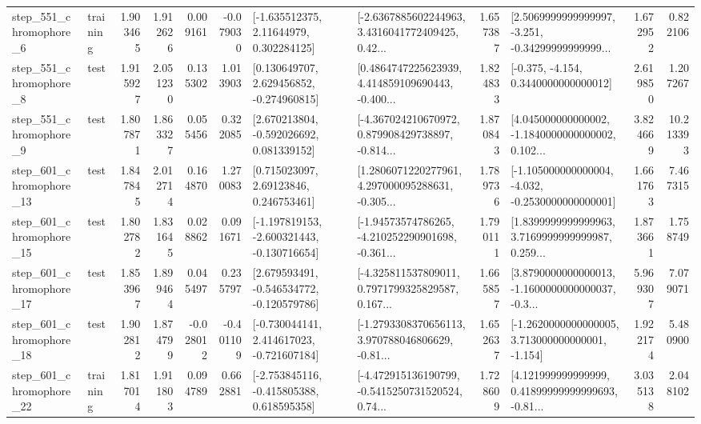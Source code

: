 \begin{tabular}{llrrrrllrlrr}
   step\_551\_chromophore\_6 &  training &      1.903465 &    1.912626 &      0.009161 & -0.079030 &     [-1.635512375, 2.11644979, 0.302284125] &  [-2.6367885602244963, 3.4316041772409425, 0.42... &       1.657387 &  [2.5069999999999997, -3.251, -0.34299999999999... &            1.672952 &          0.822106 \\
   step\_551\_chromophore\_8 &      test &      1.915927 &    2.051230 &      0.135302 &  1.013903 &    [0.130649707, 2.629456852, -0.274960815] &  [0.4864747225623939, 4.414859109690443, -0.400... &       1.824833 &               [-0.375, -4.154, 0.3440000000000012] &            2.619850 &          1.207267 \\
   step\_551\_chromophore\_9 &      test &      1.807871 &    1.863327 &      0.055456 &  0.322085 &    [2.670213804, -0.592026692, 0.081339152] &  [-4.367024210670972, 0.879908429738897, -0.814... &       1.870843 &  [4.045000000000002, -1.1840000000000002, 0.102... &            3.824669 &         10.213393 \\
  step\_601\_chromophore\_13 &      test &      1.847845 &    2.012714 &      0.164870 &  1.270083 &      [0.715023097, 2.69123846, 0.246753461] &  [1.2806071220277961, 4.297000095288631, -0.305... &       1.789736 &  [-1.105000000000004, -4.032, -0.2530000000000001] &            1.661763 &          7.467315 \\
  step\_601\_chromophore\_15 &      test &      1.802782 &    1.831645 &      0.028862 &  0.091671 &  [-1.197819153, -2.600321443, -0.130716654] &  [-1.94573574786265, -4.210252290901698, -0.361... &       1.790111 &  [1.8399999999999963, 3.7169999999999987, 0.259... &            1.873661 &          1.758749 \\
  step\_601\_chromophore\_17 &      test &      1.853967 &    1.899464 &      0.045497 &  0.235797 &   [2.679593491, -0.546534772, -0.120579786] &  [-4.325811537809011, 0.7971799325829587, 0.167... &       1.665857 &  [3.8790000000000013, -1.1600000000000037, -0.3... &            5.969307 &          7.079071 \\
  step\_601\_chromophore\_18 &      test &      1.902812 &    1.874799 &     -0.028012 & -0.401109 &   [-0.730044141, 2.414617023, -0.721607184] &  [-1.2793308370656113, 3.970788046806629, -0.81... &       1.652637 &   [-1.2620000000000005, 3.713000000000001, -1.154] &            1.922174 &          5.480900 \\
  step\_601\_chromophore\_22 &  training &      1.817014 &    1.911803 &      0.094789 &  0.662881 &   [-2.753845116, -0.415805388, 0.618595358] &  [-4.472915136190799, -0.5415250731520524, 0.74... &       1.728609 &  [4.121999999999999, 0.41899999999999693, -0.81... &            3.035138 &          2.048102 \\

\end{tabular}
